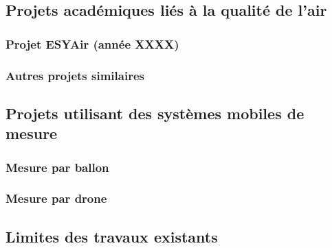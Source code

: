 \subsection{Projets académiques liés à la qualité de l'air}

\subsubsection{Projet ESYAir (année XXXX)}

\subsubsection{Autres projets similaires}

\subsection{Projets utilisant des systèmes mobiles de mesure}

\subsubsection{Mesure par ballon}

\subsubsection{Mesure par drone}

\subsection{Limites des travaux existants}

